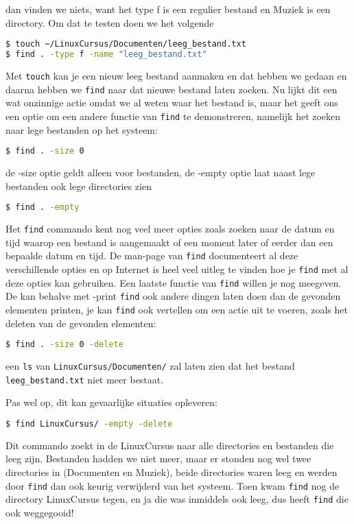 dan vinden we niets, want het type f is een regulier bestand en Muziek is een directory. Om dat te testen doen we het volgende
\begin{lstlisting}[language=bash]
$ touch ~/LinuxCursus/Documenten/leeg_bestand.txt
$ find . -type f -name "leeg_bestand.txt"
\end{lstlisting}

Met \texttt{touch} kan je een nieuw leeg bestand aanmaken en dat hebben we gedaan en daarna hebben we \texttt{find} naar dat nieuwe bestand laten zoeken. Nu lijkt dit een wat onzinnige actie omdat we al weten waar het bestand is, maar het geeft ons een optie om een andere functie van \texttt{find} te demonstreren, namelijk het zoeken naar lege bestanden op het systeem:
\begin{lstlisting}[language=bash]
$ find . -size 0
\end{lstlisting}
de -size optie geldt alleen voor bestanden, de -empty optie laat naast lege bestanden ook lege directories zien
\begin{lstlisting}[language=bash]
$ find . -empty
\end{lstlisting}

Het \texttt{find} commando kent nog veel meer opties zoals zoeken naar de datum en tijd waarop een bestand is aangemaakt of een moment later of eerder dan een bepaalde datum en tijd. De man-page van \texttt{find} documenteert al deze verschillende opties en op Internet is heel veel uitleg te vinden hoe je \texttt{find} met al deze opties kan gebruiken. Een laatste functie van \texttt{find} willen je nog meegeven. De kan behalve met -print \texttt{find} ook andere dingen laten doen dan de gevonden elementen printen, je kan \texttt{find} ook vertellen om een actie uit te voeren, zoals het deleten van de gevonden elementen:

\begin{lstlisting}[language=bash]
$ find . -size 0 -delete
\end{lstlisting}
een \texttt{ls} van \texttt{LinuxCursus/Documenten/} zal laten zien dat het bestand \texttt{leeg\_bestand.txt} niet meer bestaat.

Pas wel op, dit kan gevaarlijke situaties opleveren:
\begin{lstlisting}[language=bash]
$ find LinuxCursus/ -empty -delete
\end{lstlisting}

Dit commando zoekt in de LinuxCursus naar alle directories en bestanden die leeg zijn. Bestanden hadden we niet meer, maar er stonden nog wel twee directories in (Documenten en Muziek), beide directories waren leeg en werden door \texttt{find} dan ook keurig verwijderd van het systeem. Toen kwam \texttt{find} nog de directory LinuxCursus tegen, en ja die was inmiddels ook leeg, dus heeft \texttt{find} die ook weggegooid!

